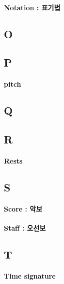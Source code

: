 \documentclass[12pt, a4paper, oneside]{book}
\begin{document}
\paragraph{Notation : 표기법}


	\subsection{O}

	\subsection{P}


	\paragraph{pitch}


	\subsection{Q}

	\subsection{R}


\paragraph{Rests}

	\subsection{S}

\paragraph{Score : 악보}

\paragraph{Staff : 오선보}


	\subsection{T}



\paragraph{Time signature}
\end{document}
